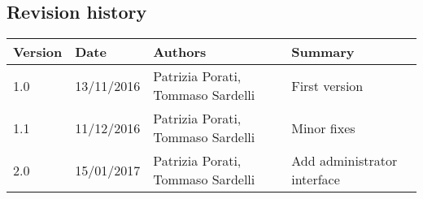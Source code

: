\subsection{Revision history}
\begin{tabular}{|l|l|l|l|}
	\hline
	\textbf{Version}	& \textbf{Date}	& \textbf{Authors}	& \textbf{Summary}\\
	\hline
	1.0 	& 13/11/2016 	& Patrizia Porati, Tommaso Sardelli 	& First version\\
	\hline
	1.1 	& 11/12/2016 	& Patrizia Porati, Tommaso Sardelli 	& Minor fixes\\
	\hline
	2.0		& 15/01/2017 	& Patrizia Porati, Tommaso Sardelli 	& Add administrator interface\\
	\hline
\end{tabular}